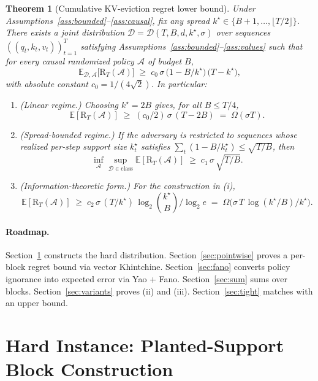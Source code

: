 \documentclass{article}
\newtheorem{theorem}{Theorem}
\theoremstyle{definition}
\theoremstyle{remark}
\newcommand{\E}{\mathbb{E}}
\newcommand{\A}{\mathcal{A}}
\newcommand{\D}{\mathcal{D}}
\newcommand{\Reg}{\mathrm{R}}
\begin{document}
\begin{theorem}[Cumulative KV-eviction regret lower bound]\label{thm:main}
Under Assumptions~\ref{ass:bounded}--\ref{ass:causal}, fix any \emph{spread} $k^\star\in\{B+1,\dots,\lfloor T/2\rfloor\}$. There exists a joint distribution $\D=\D(T,B,d,k^\star,\sigma)$ over sequences $((q_t,k_t,v_t))_{t=1}^T$ satisfying Assumptions~\ref{ass:bounded}--\ref{ass:values} such that for every causal randomized policy $\A$ of budget $B$,
\begin{equation}\label{eq:main-linear}
\E_{\D,\A}\bigl[\Reg_T(\A)\bigr] \;\ge\; c_0\,\sigma\,\bigl(1-B/k^\star\bigr)\,\bigl(T-k^\star\bigr),
\end{equation}
with absolute constant $c_0=1/(4\sqrt 2)$. In particular:
\begin{enumerate}
\item[(i)] (Linear regime.) Choosing $k^\star=2B$ gives, for all $B\le T/4$,
\[
\E[\Reg_T(\A)] \;\ge\; (c_0/2)\,\sigma\,(T-2B) \;=\; \Omega(\sigma T).
\]
\item[(ii)] (Spread-bounded regime.) If the adversary is restricted to sequences whose realized per-step support size $k_t^\star$ satisfies $\sum_t(1-B/k_t^\star)\le\sqrt{T/B}$, then
\[
\inf_{\A}\sup_{\D\in\text{class}}\E[\Reg_T(\A)] \;\ge\; c_1\,\sigma\,\sqrt{T/B}.
\]
\item[(iii)] (Information-theoretic form.) For the construction in (i),
\[
\E[\Reg_T(\A)] \;\ge\; c_2\,\sigma\,(T/k^\star)\,\log_2\binom{k^\star}{B}/\log_2 e
\;=\;\Omega\!\bigl(\sigma\,T\,\log(k^\star/B)/k^\star\bigr).
\]
\end{enumerate}
\end{theorem}

\paragraph{Roadmap.} Section~\ref{sec:construction} constructs the hard distribution. Section~\ref{sec:pointwise} proves a per-block regret bound via vector Khintchine. Section~\ref{sec:fano} converts policy ignorance into expected error via Yao + Fano. Section~\ref{sec:sum} sums over blocks. Section~\ref{sec:variants} proves (ii) and (iii). Section~\ref{sec:tight} matches with an upper bound.

\section{Hard Instance: Planted-Support Block Construction}
\label{sec:construction}
\end{document}
